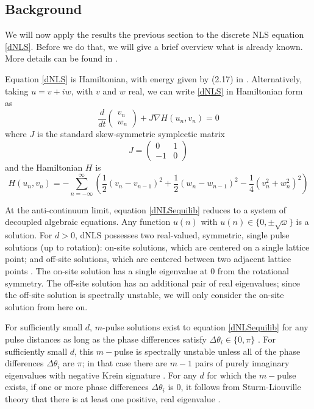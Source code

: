 \documentclass[12pt]{article}
\begin{document}
\subsection{Background}

We will now apply the results the previous section to the discrete NLS equation \eqref{dNLS}. Before we do that, we will give a brief overview what is already known. More details can be found in \cite{Kevrekidis2009}. 

Equation \eqref{dNLS} is Hamiltonian, with energy given by (2.17) in \cite{Kevrekidis2009}. Alternatively, taking $u = v + i w$, with $v$ and $w$ real, we can write \eqref{dNLS} in Hamiltonian form as
\begin{equation}\label{dNLSrealHam}
\frac{d}{dt}\begin{pmatrix}v_n \\ w_n\end{pmatrix}
+ J \nabla H(u_n, v_n) = 0
\end{equation}
where $J$ is the standard skew-symmetric symplectic matrix
\[
J = \begin{pmatrix}0 & 1 \\ -1 & 0\end{pmatrix}
\]
and the Hamiltonian $H$ is
\begin{equation}\label{dNLSrealH}
H(u_n, v_n) = -\sum_{n = -\infty}^\infty 
\left( \frac{1}{2}\left(v_n - v_{n-1}\right)^2 + \frac{1}{2}\left(w_n - w_{n-1}\right)^2 - \frac{1}{4}\left( v_n^2 + w_n^2 \right)^2 \right)
\end{equation}

At the anti-continuum limit, equation \eqref{dNLSequilib} reduces to a system of decoupled algebraic equations. Any function $u(n)$ with $u(n) \in \{ 0, \pm \sqrt{\omega}\}$ is a solution. For $d > 0$, dNLS possesses two real-valued, symmetric, single pulse solutions (up to rotation): on-site solutions, which are centered on a single lattice point; and off-site solutions, which are centered between two adjacent lattice points \cite{Kevrekidis2009}. The on-site solution has a single eigenvalue at 0 from the rotational symmetry. The off-site solution has an additional pair of real eigenvalues; since the off-site solution is spectrally unstable, we will only consider the on-site solution from here on. 

For sufficiently small $d$, $m$-pulse solutions exist to equation \eqref{dNLSequilib} for any pulse distances as long as the phase differences satisfy $\Delta \theta_i \in \{0, \pi\}$ \cite[Proposition 2.1]{Pelinovsky2005}. For sufficiently small $d$, this $m-$pulse is spectrally unstable unless all of the phase differences $\Delta \theta_i$ are $\pi$; in that case there are $m-1$ pairs of purely imaginary eigenvalues with negative Krein signature \cite[Theorem 3.6]{Pelinovsky2005}. For any $d$ for which the $m-$pulse exists, if one or more phase differences $\Delta \theta_i$ is 0, it follows from Sturm-Liouville theory that there is at least one positive, real eigenvalue \cite{Kapitula2001a}.
\end{document}
